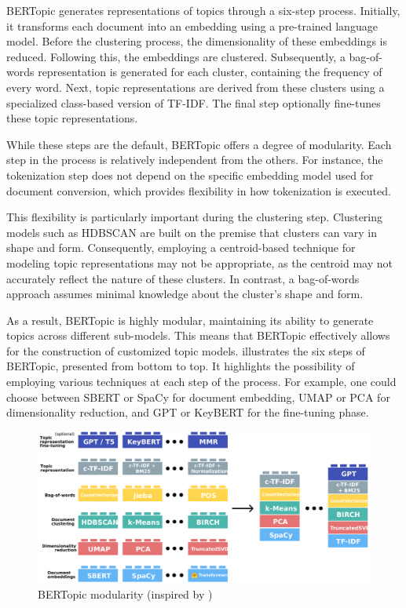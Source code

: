 \documentclass{article}
\begin{document}
BERTopic generates representations of topics through a six-step process. Initially, it transforms each document into an embedding using a pre-trained language model. Before the clustering process, the dimensionality of these embeddings is reduced. Following this, the embeddings are clustered. Subsequently, a bag-of-words representation is generated for each cluster, containing the frequency of every word. Next, topic representations are derived from these clusters using a specialized class-based version of TF-IDF. The final step optionally fine-tunes these topic representations.


While these steps are the default, BERTopic offers a degree of modularity. Each step in the process is relatively independent from the others. For instance, the tokenization step does not depend on the specific embedding model used for document conversion, which provides flexibility in how tokenization is executed.

This flexibility is particularly important during the clustering step. Clustering models such as HDBSCAN are built on the premise that clusters can vary in shape and form. Consequently, employing a centroid-based technique for modeling topic representations may not be appropriate, as the centroid may not accurately reflect the nature of these clusters. In contrast, a bag-of-words approach assumes minimal knowledge about the cluster's shape and form.

As a result, BERTopic is highly modular, maintaining its ability to generate topics across different sub-models. This means that BERTopic effectively allows for the construction of customized topic models.  illustrates the six steps of BERTopic, presented from bottom to top. It highlights the possibility of employing various techniques at each step of the process. For example, one could choose between SBERT or SpaCy for document embedding, UMAP or PCA for dimensionality reduction, and GPT or KeyBERT for the fine-tuning phase.

\begin{figure}[h] %
    \centering
    \includegraphics[width=\textwidth]{images/modularity_modified.pdf}
    \caption{BERTopic modularity (inspired by \cite{grootendorst_algorithm_nodate})}
    \label{fig:modularity_modified}
\end{figure}
\end{document}
